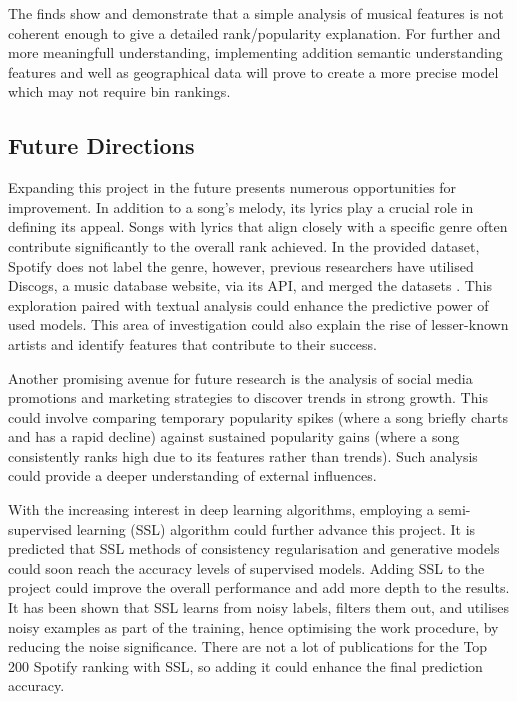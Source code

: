 \documentclass{article}
\begin{document}
The finds show and demonstrate that a simple analysis of musical features is not coherent enough to give a detailed rank/popularity explanation. For further and more meaningfull understanding, implementing addition semantic understanding features and well as geographical data will prove to create a more precise model which may not require bin rankings.

\subsection{Future Directions}

Expanding this project in the future presents numerous opportunities for improvement. In addition to a song's melody, its lyrics play a crucial role in defining its appeal. Songs with lyrics that align closely with a specific genre often contribute significantly to the overall rank achieved. In the provided dataset, Spotify does not label the genre, however, previous researchers have utilised Discogs, a music database website, via its API, and merged the datasets \cite{Luo2018}. This exploration paired with textual analysis could enhance the predictive power of used models. This area of investigation could also explain the rise of lesser-known artists and identify features that contribute to their success.

Another promising avenue for future research is the analysis of social media promotions and marketing strategies to discover trends in strong growth. This could involve comparing temporary popularity spikes (where a song briefly charts and has a rapid decline) against sustained popularity gains (where a song consistently ranks high due to its features rather than trends). Such analysis could provide a deeper understanding of external influences.

With the increasing interest in deep learning algorithms, employing a semi-supervised learning (SSL) algorithm could further advance this project. It is predicted that SSL methods of consistency regularisation and generative models could soon reach the accuracy levels of supervised models. Adding SSL to the project could improve the overall performance and add more depth to the results. It has been shown that SSL learns from noisy labels, filters them out, and utilises noisy examples as part of the training, hence optimising the work procedure, by reducing the noise significance. There are not a lot of publications for the Top 200 Spotify ranking with SSL, so adding it could enhance the final prediction accuracy. \cite{Ouali2020}
\end{document}
